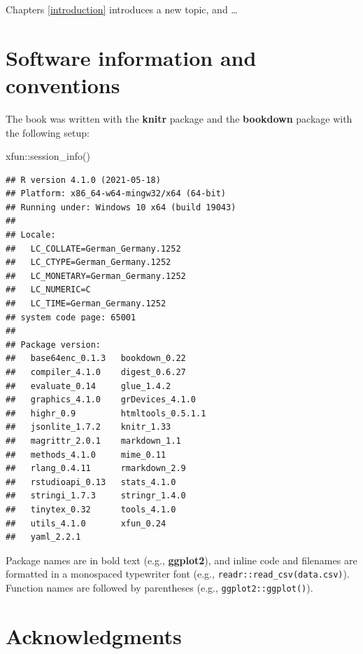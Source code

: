 \documentclass[
]{krantz}
\makeatletter
\newenvironment{Shaded}{\begin{snugshade}}{\end{snugshade}}
\newcommand{\FunctionTok}[1]{\textcolor[rgb]{0,0,0}{#1}}
\newcommand{\NormalTok}[1]{#1}
\newcommand{\SpecialCharTok}[1]{\textcolor[rgb]{0,0,0}{#1}}
\newenvironment{kframe}{%
\medskip{}
\setlength{\fboxsep}{.8em}
 \def\at@end@of@kframe{}%
 \ifinner\ifhmode%
  \def\at@end@of@kframe{\end{minipage}}%
  \begin{minipage}{\columnwidth}%
 \fi\fi%
 \def\FrameCommand##1{\hskip\@totalleftmargin \hskip-\fboxsep
 \colorbox{shadecolor}{##1}\hskip-\fboxsep
     \hskip-\linewidth \hskip-\@totalleftmargin \hskip\columnwidth}%
 \MakeFramed {\advance\hsize-\width
   \@totalleftmargin\z@ \linewidth\hsize
   \@setminipage}}%
 {\par\unskip\endMakeFramed%
 \at@end@of@kframe}
\renewenvironment{Shaded}{\begin{kframe}}{\end{kframe}}
\makeatother
\begin{document}
Chapters \ref{introduction} introduces a new topic, and \ldots{}

\hypertarget{software-information-and-conventions}{%
\section*{Software information and conventions}\label{software-information-and-conventions}}


The book was written with the \textbf{knitr} package \citep{xie2015} and the \textbf{bookdown} package \citep{R-bookdown} with the following setup:

\begin{Shaded}
\begin{Highlighting}[]
\NormalTok{xfun}\SpecialCharTok{::}\FunctionTok{session\_info}\NormalTok{()}
\end{Highlighting}
\end{Shaded}

\begin{verbatim}
## R version 4.1.0 (2021-05-18)
## Platform: x86_64-w64-mingw32/x64 (64-bit)
## Running under: Windows 10 x64 (build 19043)
## 
## Locale:
##   LC_COLLATE=German_Germany.1252 
##   LC_CTYPE=German_Germany.1252   
##   LC_MONETARY=German_Germany.1252
##   LC_NUMERIC=C                   
##   LC_TIME=German_Germany.1252    
## system code page: 65001
## 
## Package version:
##   base64enc_0.1.3   bookdown_0.22    
##   compiler_4.1.0    digest_0.6.27    
##   evaluate_0.14     glue_1.4.2       
##   graphics_4.1.0    grDevices_4.1.0  
##   highr_0.9         htmltools_0.5.1.1
##   jsonlite_1.7.2    knitr_1.33       
##   magrittr_2.0.1    markdown_1.1     
##   methods_4.1.0     mime_0.11        
##   rlang_0.4.11      rmarkdown_2.9    
##   rstudioapi_0.13   stats_4.1.0      
##   stringi_1.7.3     stringr_1.4.0    
##   tinytex_0.32      tools_4.1.0      
##   utils_4.1.0       xfun_0.24        
##   yaml_2.2.1
\end{verbatim}

Package names are in bold text (e.g., \textbf{ggplot2}), and inline code and filenames are formatted in a monospaced typewriter font (e.g., \texttt{readr::read\_csv(\textquotesingle{}data.csv\textquotesingle{})}). Function names are followed by parentheses (e.g., \texttt{ggplot2::ggplot()}).

\hypertarget{acknowledgments}{%
\section*{Acknowledgments}\label{acknowledgments}}
\end{document}
